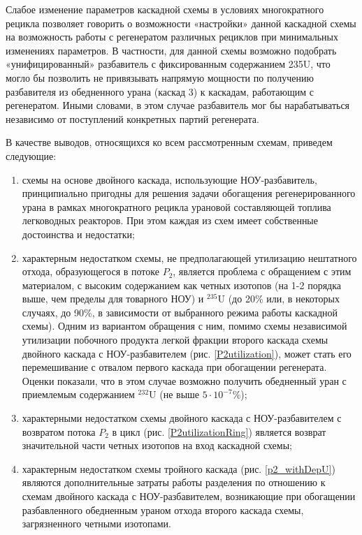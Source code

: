 Слабое изменение параметров каскадной схемы в условиях многократного рецикла позволяет говорить о возможности «настройки» данной каскадной схемы на возможность работы с регенератом различных рециклов при минимальных изменениях параметров. В частности, для данной схемы возможно подобрать «унифицированный» разбавитель с фиксированным содержанием 235U, что могло бы позволить не привязывать напрямую мощности по получению разбавителя из обедненного урана (каскад 3) к каскадам, работающим с регенератом. Иными словами, в этом случае разбавитель мог бы нарабатываться независимо от поступлений конкретных партий регенерата.



В качестве выводов, относящихся ко всем рассмотренным схемам, приведем следующие:
\begin{enumerate}
    \item схемы на основе двойного каскада, использующие НОУ-разбавитель, принципиально пригодны для решения задачи обогащения регенерированного урана в рамках многократного рецикла урановой составляющей топлива легководных реакторов. При этом каждая из схем имеет собственные достоинства и недостатки;
    \item характерным недостатком схемы, не предполагающей утилизацию нештатного отхода, образующегося в потоке $P_2$, является проблема с обращением с этим материалом, с высоким содержанием как четных изотопов (на 1-2 порядка выше, чем пределы для товарного НОУ) и $^{235}$U (до 20\% или, в некоторых случаях, до 90\%, в зависимости от выбранного режима работы каскадной схемы). Одним из вариантом обращения с ним, помимо схемы независимой утилизации побочного продукта легкой фракции второго каскада схемы двойного каскада с НОУ-разбавителем (рис. \ref{P2utilization}), может стать его перемешивание с отвалом первого каскада при обогащении регенерата. Оценки показали, что в этом случае возможно получить обедненный уран с приемлемым содержанием $^{232}$U (не выше $5\cdot10^{-7}$\%);
    \item характерными недостатком схемы двойного каскада с НОУ-разбавителем с возвратом потока $P_2$ в цикл (рис. \ref{P2utilizationRing}) является возврат значительной части четных изотопов на вход каскадной схемы;
    \item характерным недостатком схемы тройного каскада (рис. \ref{p2_withDepU}) являются дополнительные затраты работы разделения по отношению к схемам двойного каскада с НОУ-разбавителем, возникающие при обогащении разбавленного обедненным ураном отхода второго каскада схемы, загрязненного четными изотопами.
  \end{enumerate}

